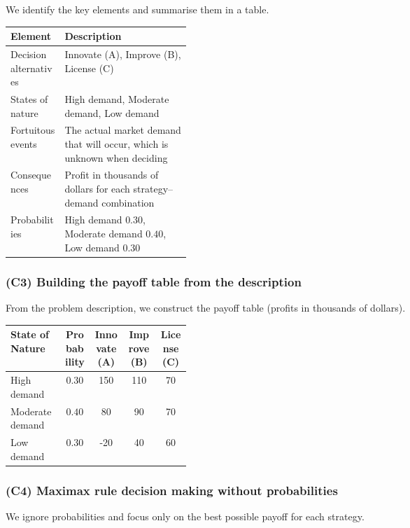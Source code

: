 	We identify the key elements and summarise them in a table.
	
	\begin{center}
		\begin{tabularx}{\linewidth}{@{}L{0.3\linewidth}Y@{}}
			\toprule
			Element & Description \\
			\midrule
			Decision alternatives & Innovate (A), Improve (B), License (C) \\
			States of nature & High demand, Moderate demand, Low demand \\
			Fortuitous events & The actual market demand that will occur, which is unknown when deciding \\
			Consequences & Profit in thousands of dollars for each strategy--demand combination \\
			Probabilities & High demand \(0.30\), Moderate demand \(0.40\), Low demand \(0.30\) \\
			\bottomrule
		\end{tabularx}
	\end{center}
	
	\subsubsection{(C3) Building the payoff table from the description}\label{example-1-c3}
	
	From the problem description, we construct the payoff table (profits in thousands of dollars).
	
	\begin{center}
		\begin{tabularx}{\linewidth}{@{}L{0.3\linewidth}C C C C@{}}
			\toprule
			State of Nature & Probability & Innovate (A) & Improve (B) & License (C) \\
			\midrule
			High demand     & \(0.30\) & 150  & 110 & 70 \\
			Moderate demand & \(0.40\) & 80   & 90  & 70 \\
			Low demand      & \(0.30\) & -20  & 40  & 60 \\
			\bottomrule
		\end{tabularx}
	\end{center}
	
	\subsubsection{(C4) Maximax rule decision making without probabilities}\label{example-1-c4}
	
	We ignore probabilities and focus only on the best possible payoff for each strategy.
	
